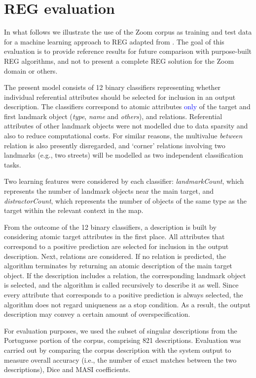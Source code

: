 \documentclass[11pt]{article}
\begin{document}
\section{REG evaluation}
\label{sec-eval}

In what follows we illustrate the use of the Zoom corpus as training and test data for a machine learning approach to REG adapted from \cite{thiago-svm}. The  goal of this evaluation is to provide reference results for future comparison with purpose-built REG algorithms, and not to present a complete REG solution for the Zoom domain or others.

The present model consists of 12 binary classifiers representing whether individual referential attributes should be selected for inclusion in an output description. The classifiers correspond to atomic attributes \textcolor{blue}{only} of the target and first landmark object ({\em type}, {\em name} and {\em others}), and relations. Referential attributes of other landmark objects were not modelled due to data sparsity and also to reduce computational costs. For similar reasons, the multivalue {\em between} relation is also presently disregarded, and `corner' relations involving two landmarks (e.g., two streets) will be modelled as two independent classification tasks.

Two learning features were considered by each classifier: {\em landmarkCount}, which represents the number of landmark objects near the main target, and {\em distractorCount}, which represents the number of objects of the same type as the target within the relevant context in the map.

From the outcome of the 12 binary classifiers, a description is built by considering atomic target attributes in the first place. All attributes that correspond to a positive prediction are selected for inclusion in the output description. Next, relations are considered. If no relation is predicted, the algorithm terminates by returning an atomic description  of the main target object. If the description includes a relation, the corresponding landmark object is selected, and the algorithm is called recursively to describe it as well. Since every attribute that corresponds to a positive prediction is always selected, the algorithm does not regard uniqueness as a stop condition. As a result, the output description may convey a certain amount of overspecification.

For evaluation purposes, we used the subset of singular descriptions from the Portuguese portion of the corpus, comprising 821 descriptions. Evaluation was carried out by comparing the corpus description with the system output to measure overall accuracy (i.e., the number of exact matches between the two descriptions), Dice \cite{dice} and MASI \cite{masi} coefficients.%
\end{document}
